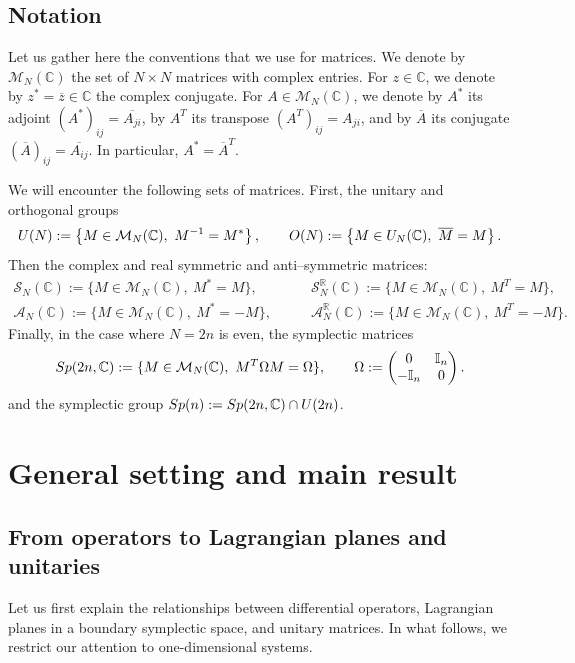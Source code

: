 \documentclass[11pt]{amsart}
\numberwithin{equation}{section} %
\newcommand\1{{\mathds 1}}
\def\C{{\mathbb C}}
\def\bbI{{\mathbb I}}
\def\R{{\mathbb R}}
\def\cA{{\mathcal A}}
\def\cM{{\mathcal M}}
\def\cS{{\mathcal S}}
\def\U{{\rm U}}
\def\O{{\rm O}}
\def\Sp{{\rm Sp}}
\begin{document}
\subsection*{Notation}
Let us gather here the conventions that we use for matrices. We denote by $\cM_N(\C)$ the set of $N \times N$ matrices with complex entries. For $z \in \C$, we denote by $z^* = \overline{z} \in \C$ the complex conjugate. For $A \in \cM_N(\C)$, we denote by $A^*$ its adjoint $(A^*)_{ij} = \overline{A_{ji}}$, by $A^T$ its transpose $(A^T)_{ij} = A_{ji}$, and by $\overline{A}$ its conjugate $(\overline{A})_{ij} = \overline{A_{ij}}$. In particular, $A^* = \overline{A}^T$. 

\medskip

We will encounter the following sets of matrices. First, the unitary and orthogonal groups
\[
    \U(N)  := \left\{ M \in \cM_N(\C), \ M^{-1} = M^* \right\}, \qquad    
    \O(N) := \left\{ M \in \U_N(\C), \ \overline{M} = M \right\}.
\]
Then the complex and real symmetric and anti--symmetric matrices:
\begin{align*}
     \cS_N(\C)  := \{M \in \cM_N(\C), \  M^*= M \}, & \qquad
    \cS_N^\R(\C) := \{M \in \cM_N(\C), \ M^T= M\}, \\
     \cA_N(\C)  := \{M \in \cM_N(\C), \ M^*= - M\}, & \qquad  
   	\cA_N^\R(\C) := \{M \in \cM_N(\C), \  M^T= - M\}.
\end{align*}
Finally, in the case where $N = 2n$ is even, the symplectic matrices
\begin{equation} \label{eq:def:symplectic_Omega}
    \Sp(2n,\C) := \{M \in\cM_N(\C), \  M^T \Omega M = \Omega\},  \qquad
    \Omega := \begin{pmatrix}
    0 & \bbI_n \\ - \bbI_n & 0
\end{pmatrix}.
\end{equation}
and the symplectic group $\Sp(n) := \Sp(2n,\C) \cap \U(2n)$.



\section{General setting and main result\label{sec:main}}



\subsection{From operators to Lagrangian planes and unitaries}
Let us first explain the relationships between differential operators, Lagrangian planes in a boundary symplectic space, and unitary matrices. In what follows, we restrict our attention to one-dimensional systems. 
\end{document}
